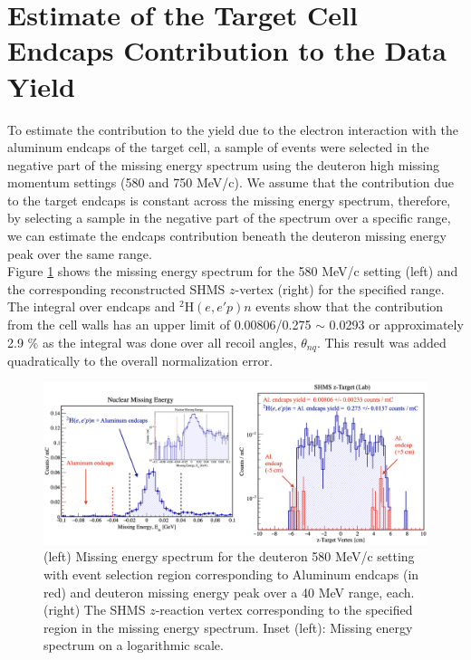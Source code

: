 \documentclass[aps, prl]{revtex4-2}  %
\begin{document}
\section{\large Estimate of the Target Cell Endcaps Contribution to the Data Yield}
\indent To estimate the contribution to the yield due to the electron interaction with the aluminum endcaps of the target cell,
a sample of events were selected in the negative part of the missing energy spectrum using the deuteron high missing momentum settings (580 and 750 MeV/c).
We assume that the contribution due to the target endcaps is constant across the missing energy spectrum, therefore, by selecting a sample in the
negative part of the spectrum over a specific range, we can estimate the endcaps contribution beneath the deuteron missing energy peak over the same range.\\
\indent Figure \ref{fig:tgt_wall} shows the missing energy spectrum for the 580 MeV/c setting (left) and the corresponding reconstructed SHMS $z$-vertex (right) for the specified
range. The integral over endcaps and $^{2}\mathrm{H}(e,e'p)n$ events show that the contribution from the cell walls has an upper limit of 0.00806/0.275 $\sim$ 0.0293 or approximately 2.9 $\%$
as the integral was done over all recoil angles, $\theta_{nq}$. This result was added quadratically to the overall normalization error.
\begin{figure}[!h]
\includegraphics[scale=0.33]{plots/tgt_bkg_d2_pm580_allthnq.png}
\caption{(left) Missing energy spectrum for the deuteron 580 MeV/c setting with event selection region corresponding to Aluminum endcaps (in red) and deuteron missing energy peak over
  a 40 MeV range, each. (right) The SHMS $z$-reaction vertex corresponding to the specified region in the missing energy spectrum. Inset (left): Missing energy spectrum on a logarithmic
  scale.}
\label{fig:tgt_wall}
\end{figure}
\end{document}
